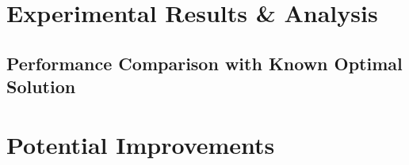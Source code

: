 \documentclass[a4paper]{article}
\begin{document}
\section{Experimental Results \& Analysis}
\subsection{Performance Comparison with Known Optimal Solution}
\section{Potential Improvements}

\nocite{*}
\printbibliography
\end{document}
